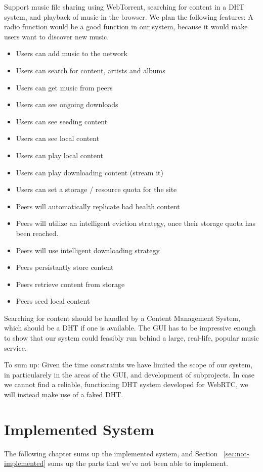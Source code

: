 Support music file sharing using WebTorrent,
searching for content in a DHT system,
and playback of music in the browser.
We plan the following features:
A radio function would be a good function in our system, because it would make users want to discover new music.
\begin{itemize}
	\item Users can add music to the network
	\item Users can search for content, artists and albums
	\item Users can get music from peers
	\item Users can see ongoing downloads
	\item Users can see seeding content
	\item Users can see local content
	\item Users can play local content
    \item Users can play downloading content (stream it)
    \item Users can set a storage / resource quota for the site
	\item Peers will automatically replicate bad health content
    \item Peers will utilize an intelligent eviction strategy, once their
        storage quota has been reached.
	\item Peers will use intelligent downloading strategy
	\item Peers persistantly store content
	\item Peers retrieve content from storage
	\item Peers seed local content
\end{itemize}

Searching for content should be handled by a Content Management System,
which should be a \acs{DHT} if one is available.
The \acs{GUI} has to be impressive enough to show that our system
could feasibly run behind a large, real-life, popular music service.

To sum up: Given the time constraints we have limited the scope of our system,
in particularely in the areas of the \acs{GUI}, and development of subprojects.
In case we cannot find a reliable, functioning \acs{DHT} system developed for WebRTC,
we will instead make use of a faked \acs{DHT}.

\section{Implemented System}
The following chapter sums up the implemented system, and Section~
\ref{sec:not-implemented} sums up the parts that we've not been able to implement.
